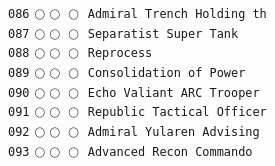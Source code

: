 \documentclass[a4paper,landscape]{article}
\begin{document}
\begin{multicols*}{5}
\texttt{086} \(\bigcirc\!\bigcirc\!\bigcirc\)  \texttt{Admiral Trench Holding th} \vspace{-0.3mm}\\ 
\texttt{087} \(\bigcirc\!\bigcirc\!\bigcirc\)  \texttt{Separatist Super Tank} \vspace{-0.3mm}\\ 
\texttt{088} \(\bigcirc\!\bigcirc\!\bigcirc\)  \texttt{Reprocess} \vspace{-0.3mm}\\ 
\texttt{089} \(\bigcirc\!\bigcirc\!\bigcirc\)  \texttt{Consolidation of Power} \vspace{-0.3mm}\\ 
\texttt{090} \(\bigcirc\!\bigcirc\!\bigcirc\)  \texttt{Echo Valiant ARC Trooper} \vspace{-0.3mm}\\ 
\texttt{091} \(\bigcirc\!\bigcirc\!\bigcirc\)  \texttt{Republic Tactical Officer} \vspace{-0.3mm}\\ 
\texttt{092} \(\bigcirc\!\bigcirc\!\bigcirc\)  \texttt{Admiral Yularen Advising } \vspace{-0.3mm}\\ 
\texttt{093} \(\bigcirc\!\bigcirc\!\bigcirc\)  \texttt{Advanced Recon Commando} \vspace{-0.3mm}\\ 

\end{multicols*}
\end{document}
